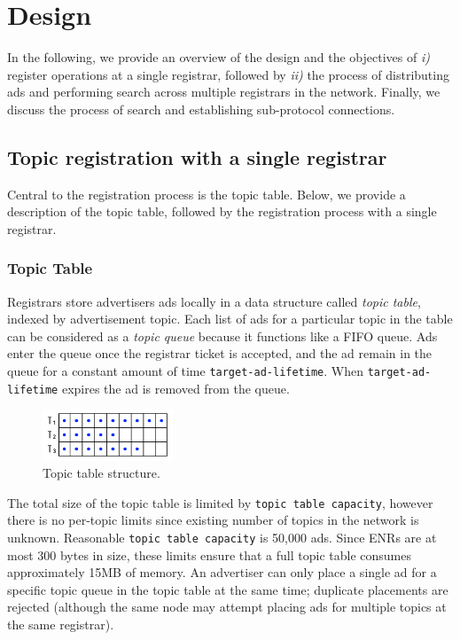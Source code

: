 
\section{Design}
\label{sec:design}

In the following, we provide an overview of the design and the objectives of \textit{i)} register operations at a single registrar, followed by \textit{ii)} the process of distributing ads and performing search across multiple registrars in the network. Finally, we discuss the process of search and establishing sub-protocol connections. 

\subsection{Topic registration with a single registrar}

Central to the registration process is the topic table. Below, we provide a description of the topic table, followed by the registration process with a single registrar. 

\subsubsection{Topic Table}

Registrars store advertisers ads locally in a data structure called \emph{topic table}, 
indexed by advertisement topic. 
Each list of ads for a particular topic in the table  can be considered as a \emph{topic queue} because it functions like a FIFO queue.
Ads enter the queue once the registrar ticket is accepted,  and
the ad remain in the queue for a constant amount of time \texttt{target-ad-lifetime}. 
When \texttt{target-ad-lifetime} expires the ad is removed  from the queue.

\begin{figure}
    \includegraphics[width=0.35\textwidth]{img/topic-queue-diagram.png}
    \caption{Topic table structure.}
    \label{fig:topic_table}
 \end{figure}

The total size of the topic table is limited by \texttt{topic table capacity},  however there is no per-topic limits since existing number of topics in the network is unknown. 
Reasonable \texttt{topic table capacity} is 50,000 ads. 
Since ENRs are at most 300 bytes in size, these limits ensure that a full topic table consumes approximately 15MB of memory.
An advertiser can only place a single ad for a specific topic queue in the topic table at the same time; duplicate placements are rejected (although the same node may attempt placing ads for multiple topics at the same registrar).

